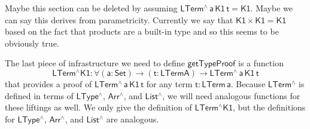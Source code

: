 \documentclass[9pt]{entcs} \usepackage{entcsmacro}
\begin{document}
{\color{red} Maybe this section can be deleted by assuming $\mathsf{LTerm^{\wedge}\, a\, K1\,t = K1}$.
Maybe we can say this derives from parametricity.
Currently we say that $\mathsf{K1 \times K1 = K1}$ based on the fact that products are a built-in type and so this seems to be obviously true.}

The last piece of infrastructure we need to define $\mathsf{getTypeProof}$ is a function 
\[
  \mathsf{LTerm^{\wedge}K1 : \forall (a : Set) \to (t : LTerm A) \to LTerm^{\wedge}\, a\, K1\,t}
\]
that provides a 
proof of $\mathsf{LTerm^{\wedge}\,a\,K1\,t}$ for any term $\mathsf{t : LTerm\, a}$. 
Because $\mathsf{LTerm^{\wedge}}$ is defined in terms of $\mathsf{LType^{\wedge}}$, $\mathsf{Arr^{\wedge}}$, 
and $\mathsf{List^{\wedge}}$, we will need analogous functions for these liftings as well. 
We only give the definition of $\mathsf{LTerm^{\wedge}K1}$, but the definitions for 
$\mathsf{LType^{\wedge}}$, $\mathsf{Arr^{\wedge}}$, and $\mathsf{List^{\wedge}}$ are analogous. 
\end{document}
